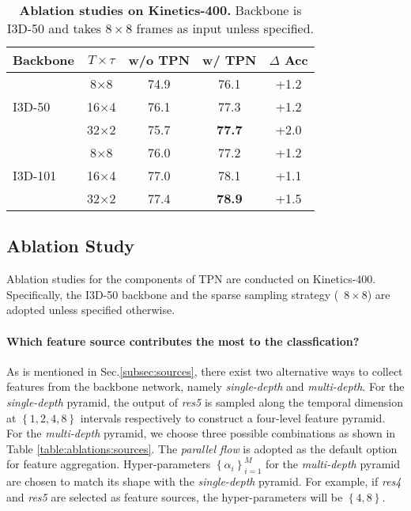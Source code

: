 \documentclass[10pt,twocolumn,letterpaper]{article}
\begin{document}
\begin{table*}[t]
{        \begin{tabular}{lcccc}
            \hline
            Backbone     & $T \times \tau$               & w/o TPN     &   w/ TPN       & $\Delta$ Acc        \\ \hline
                         & 8$\times$8                & 74.9        &   76.1         &  +1.2                      \\
            I3D-50       & 16$\times$4               & 76.1        &   77.3         &  +1.2                    \\
                         & 32$\times$2               & 75.7        &   \textbf{77.7}&  +2.0                    \\ \hline
                         & 8$\times$8                & 76.0        &   77.2         &  +1.2                     \\
            I3D-101      & 16$\times$4               & 77.0        &   78.1         &  +1.1                     \\
                         & 32$\times$2               & 77.4        &   \textbf{78.9}&  +1.5                     \\ \hline
\end{tabular}
    }
    
    \vspace{1em}
    \caption{
        \textbf{Ablation studies on Kinetics-400.}
        Backbone is I3D-50 and takes $8\times 8$ frames as input unless specified.
        }
    \label{table:ablations}
\end{table*}


\subsection{Ablation Study}\label{subsec:ablation}
Ablation studies for the components of TPN are conducted on Kinetics-400.
Specifically, the I3D-50 backbone and the sparse sampling strategy (\ie~$8\times8$) are adopted unless specified otherwise.


\paragraph{Which feature source contributes the most to the classfication?}
As is mentioned in Sec.\ref{subsec:sources}, there exist two alternative ways to collect features from the backbone network, namely \emph{single-depth} and \emph{multi-depth}.
For the \emph{single-depth} pyramid, the output of \emph{res5} is sampled along the temporal dimension at $\left\{1,2,4,8\right\}$ intervals respectively to construct a four-level feature pyramid.
For the \emph{multi-depth} pyramid, we choose three possible combinations as shown in Table \ref{table:ablations:sources}.
The \emph{parallel flow} is adopted as the default option for feature aggregation. 
Hyper-parameters $\left\{\alpha_i\right\}_{i=1}^M$ for the \emph{multi-depth} pyramid are chosen to match its shape with the \emph{single-depth} pyramid.
For example, if \emph{res4} and \emph{res5} are selected as feature sources, the hyper-parameters will be $\left\{4, 8\right\}$.
\end{document}
